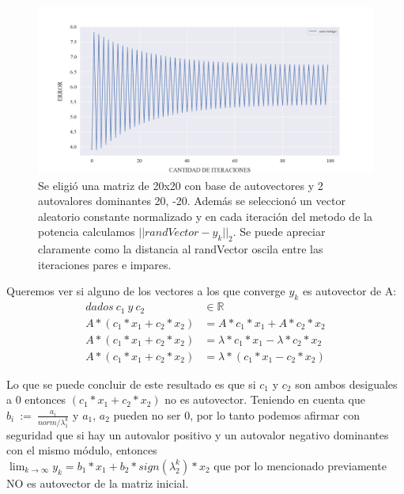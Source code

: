 \begin{figure}[!htbp]
\includegraphics[scale=0.45]{files/src/.media/op_oscilante.png}
\caption{Se eligió una matriz de 20x20 con base de autovectores y 2 autovalores dominantes 20, -20. Además se seleccionó un vector aleatorio constante normalizado y en cada iteración del metodo de la potencia calculamos $||randVector - y_k||_2$. Se puede apreciar claramente como la distancia al randVector oscila entre las iteraciones pares e impares.}
\end{figure}

\vspace{2em}

Queremos ver si alguno de los vectores a los que converge $y_k$ es autovector de A:
\begin{align}
    dados\ c_1 \ y \ c_2 &\in \mathbb{R} \\
    A * (c_1 * x_1 + c_2 * x_2) &= A * c_1 * x_1 + A * c_2 * x_2 \\
    A * (c_1 * x_1 + c_2 * x_2) &= \lambda * c_1 * x_1 - \lambda * c_2 * x_2 \\
    A * (c_1 * x_1 + c_2 * x_2) &= \lambda * (c_1 * x_1 - c_2 * x_2) 
\end{align}

Lo que se puede concluir de este resultado es que si $c_1$ y $c_2$ son ambos desiguales a 0 entonces $(c_1 * x_1 + c_2 * x_2)$ no es autovector. Teniendo en cuenta que $b_i \ := \ \frac{a_i}{norm / \lambda_{1}^{k}}$ y $a_1$, $a_2$ pueden no ser 0, por lo tanto podemos afirmar con seguridad que si hay un autovalor positivo y un autovalor negativo dominantes con el mismo módulo, entonces \\ $\lim_{k \to \infty} y_k = b_1 * x_1 + b_2 * sign(\lambda_{2}^{k}) * x_2$ que por lo mencionado previamente NO es autovector de la matriz inicial.

\vspace{1em}

